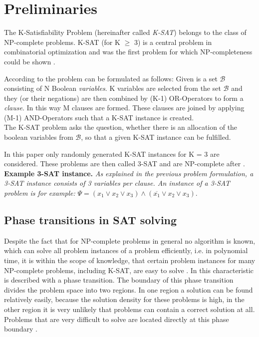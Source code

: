 \section{Preliminaries}
\label{sec:preliminaries}

The K-Satisfiability Problem (hereinafter called \emph{K-SAT}) belongs to the class of NP-complete problems. K-SAT (for K $\geq$ 3) is a central problem in combinatorial optimization and was the first problem for which NP-completeness could be shown \cite{mezard2002random}.

According to \cite{mezard2002random} the problem can be formulated as follows:
Given is a set $\mathcal{B}$ consisting of N Boolean \emph{variables}. K variables are selected from the set $\mathcal{B}$ and they (or their negations) are then combined by (K-1) OR-Operators to form a \emph{clause}.
In this way M clauses are formed. These clauses are joined by applying (M-1) AND-Operators such that a K-SAT instance is created.\\The K-SAT problem asks the question, whether there is an allocation of the boolean variables from $\mathcal{B}$, so that a given K-SAT instance can be fulfilled. 

In this paper only randomly generated K-SAT instances for K = 3 are considered. These problems are then called 3-SAT and are NP-complete after \cite{cook1971complexity}.\\

\textbf{Example 3-SAT instance.} \emph{As explained in the previous problem formulation, a 3-SAT instance consists of 3 variables per clause. An instance of a 3-SAT problem is for example:} $\Psi = ( x_{1} \vee x_{2} \vee x_{3}) \wedge ( \overline{x_{1}} \vee x_{2} \vee x_{3})$.\\

\subsection{Phase transitions in SAT solving}
Despite the fact that for NP-complete problems in general no algorithm is known, which can solve all problem instances of a problem efficiently, i.e. in polynomial time, it is within the scope of knowledge, that certain problem instances for many NP-complete problems, including K-SAT, are easy to solve \cite{cheeseman1991really}. In \cite{monasson1999determining} this characteristic is described with a phase transition. The boundary of this phase transition divides the problem space into two regions. In one region a solution can be found relatively easily, because the solution density for these problems is high, in the other region it is very unlikely that problems can contain a correct solution at all. Problems that are very difficult to solve are located directly at this phase boundary \cite{cheeseman1991really}. 

